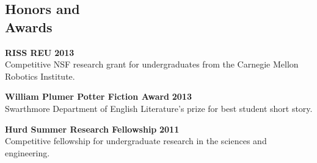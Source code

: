 \documentclass[line]{resume}
\begin{document}
\begin{resume}
\section{\mysidestyle Honors and\\Awards} 
\textbf{RISS REU} \hfill \textbf{2013}\\
Competitive NSF research grant for undergraduates from the Carnegie Mellon Robotics Institute.

\textbf{William Plumer Potter Fiction Award} \hfill \textbf{2013}\\
Swarthmore Department of English Literature's prize for best student short story.

\textbf{Hurd Summer Research Fellowship} \hfill \textbf{2011}\\
Competitive fellowship for undergraduate research in the sciences and engineering.\\

\end{resume}
\end{document}
